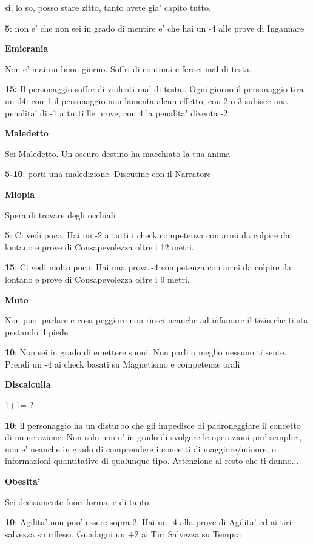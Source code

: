 \documentclass[a4paper,11pt,twoside,openany]{dndbook}
\begin{document}
{si, lo so, posso stare zitto, tanto avete gia' capito tutto.

\textbf{5}: non e' che non sei in grado di mentire e' che hai un -4 alle prove di Ingannare

\textbf{Emicrania}

Non e' mai un buon giorno. Soffri di continui e feroci mal di testa.

\textbf{15:} Il personaggio soffre di violenti mal di testa.. Ogni giorno il personaggio tira un d4: con 1 il personaggio non lamenta alcun effetto, con 2 o 3 subisce una penalita' di -1 a tutti lle prove, con 4 la penalita' diventa -2.

\textbf{Maledetto}

Sei Maledetto. Un oscuro destino ha macchiato la tua anima

\textbf{5-10}: porti una maledizione. Discutine con il Narratore

\textbf{Miopia}

Spera di trovare degli occhiali

\textbf{5}: Ci vedi poco. Hai un -2 a tutti i check competenza con armi da colpire da lontano e prove di Consapevolezza oltre i 12 metri.

\textbf{15}: Ci vedi molto poco. Hai una prova -4 competenza con armi da colpire da lontano e prove di Consapevolezza oltre i 9 metri. 

\textbf{Muto}

Non puoi parlare e cosa peggiore non riesci neanche ad infamare il
tizio che ti sta pestando il piede

\textbf{10}: Non sei in grado di emettere suoni. Non parli o meglio nessuno ti sente. Prendi un -4 ai check basati su Magnetismo e competenze orali

\textbf{Discalculia}

1+1= ?

\textbf{10}: il personaggio ha un disturbo che gli impedisce di padroneggiare il concetto di numerazione. Non solo non e' in grado di svolgere le operazioni piu' semplici, non e' neanche in grado di comprendere i concetti di maggiore/minore, o informazioni quantitative di qualunque tipo. 
Attenzione al resto che ti danno...

\textbf{Obesita'}

Sei decisamente fuori forma, e di tanto.

\textbf{10}: Agilita' non puo' essere sopra 2. Hai un -4 alla prove di Agilita' ed ai tiri salvezza su riflessi. Guadagni un +2 ai Tiri Salvezza su Tempra

}
\end{document}
